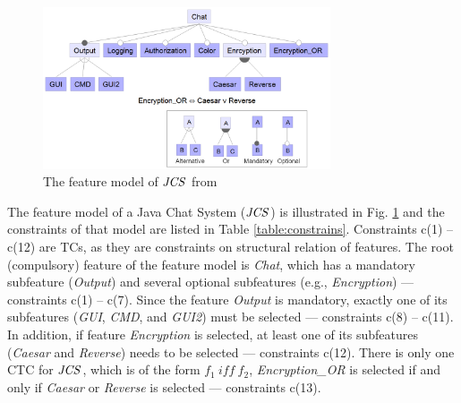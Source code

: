 

\begin{figure}[t]
\centering
\vspace{-1mm}
\includegraphics[width=8.5cm]{image/fm2.png}
\vspace{-2mm}
\caption{The feature model of $\mathit{JCS}$ from \cite{DBLP:conf/issta/TanXCSLD15}}

\label{fig:re}
\end{figure}

The feature model of a Java Chat System ($\mathit{JCS}$) is illustrated in Fig. \ref{fig:re} and the constraints of that model are listed in Table \ref{table:constrains}.
 Constraints c(1) -- c(12) are TCs, as they are constraints on structural relation of features. The root (compulsory) feature of the feature model is \textit{Chat}, which has a mandatory subfeature (\textit{Output}) and several optional subfeatures (e.g., \textit{Encryption}) --- constraints c(1) -- c(7). Since the feature \textit{Output}  is mandatory, exactly one of its subfeatures (\textit{GUI}, \textit{CMD}, and \textit{GUI2}) must be selected --- constraints c(8) -- c(11). In addition, if feature \textit{Encryption}  is selected, at least one of its subfeatures (\textit{Caesar} and \textit{Reverse}) needs to be selected --- constraints c(12). There is only one CTC for $\mathit{JCS}$, which is of the form $f_1\ \mathit{iff}\ f_2$, \textit{Encryption\_OR} is selected if and only if \textit{Caesar} or \textit{Reverse} is selected ---  constraints c(13).

